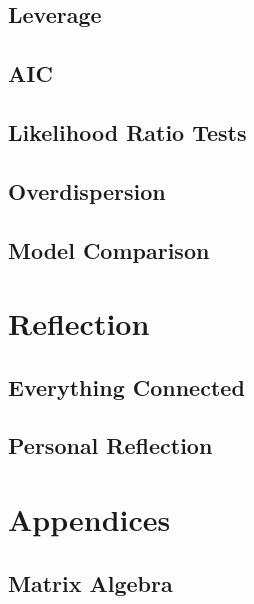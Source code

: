 \documentclass[12pt,a4paper]{report}
\begin{document}
\chapter*{Leverage}

\chapter*{AIC}

\chapter*{Likelihood Ratio Tests}

\chapter*{Overdispersion}

\chapter*{Model Comparison}

\part{Reflection}

\chapter{Everything Connected}

\chapter{Personal Reflection}

\part{Appendices}

\chapter*{Matrix Algebra}
\end{document}
